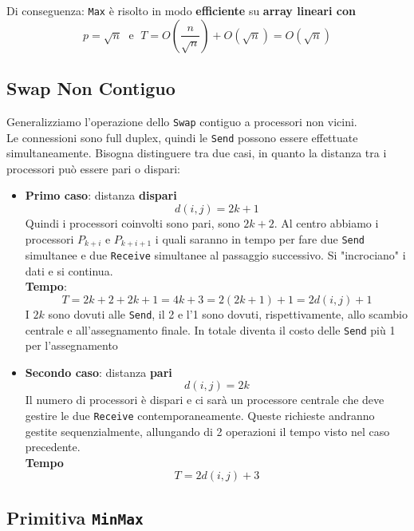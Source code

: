 Di conseguenza: \texttt{Max} è risolto in modo \textbf{efficiente} su \textbf{array lineari con}
$$ p = \sqrt{n} \; \text{ e } \; T = O \left(\frac{n}{\sqrt{n}}\right) + O(\sqrt{n}) = O(\sqrt{n}) $$

\newpage

\subsection{Swap Non Contiguo}

Generalizziamo l'operazione dello \texttt{Swap} contiguo a processori non vicini.\\

Le connessioni sono full duplex, quindi le \texttt{Send} possono essere effettuate simultaneamente. Bisogna distinguere tra due casi, in quanto la distanza tra i processori può essere pari o dispari: 
\begin{itemize}
	\item \textbf{Primo caso}: distanza \textbf{dispari}
	$$ d(i,j) = 2k + 1 $$
	Quindi i processori coinvolti sono pari, sono $2k+2$. Al centro abbiamo i processori $P_{k+i}$ e $P_{k+i+1}$ i quali saranno in tempo per fare due \texttt{Send} simultanee e due \texttt{Receive} simultanee al passaggio successivo. Si "incrociano" i dati e si continua.\\
	
	\textbf{Tempo}: 
	$$ T = 2k + 2 + 2k + 1 = 4k + 3 = 2(2k + 1) + 1 = 2 d(i,j) + 1 $$
	I $2k$ sono dovuti alle \texttt{Send}, il 2 e l'1 sono dovuti, rispettivamente, allo scambio centrale e all'assegnamento finale. In totale diventa il costo delle \texttt{Send} più 1 per l'assegnamento\\
	
	
	\item \textbf{Secondo caso}: distanza \textbf{pari}
	$$ d(i,j) = 2k $$
	Il numero di processori è dispari e ci sarà un processore centrale che deve gestire le due \texttt{Receive} contemporaneamente. Queste richieste andranno gestite sequenzialmente, allungando di 2 operazioni il tempo visto nel caso precedente.\\
	
	\textbf{Tempo}
	$$ T = 2 d(i,j) + 3 $$
\end{itemize}

\newpage

\subsection{Primitiva \texttt{MinMax}}

